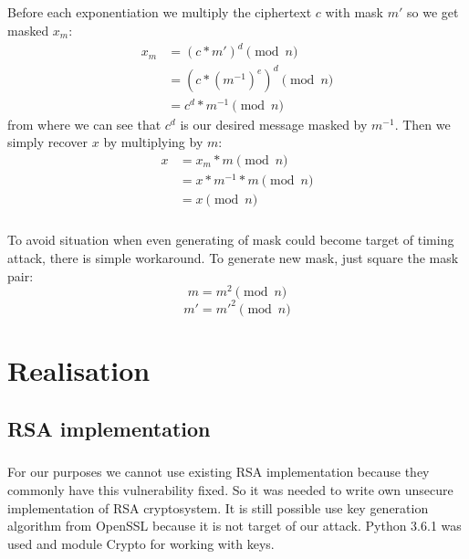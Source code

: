 \documentclass[thesis=B,english]{FITthesis}[2012/10/20]
\begin{document}
{\paragraph*{}
{Before each exponentiation we multiply the ciphertext \(c\) with mask \(m'\) so we get masked \(x_m\):
\begin{equation}
\begin{split}
 x_m & = (c*m')^d \pmod{n} \\
 & = (c * (m^{-1})^e)^d \pmod{n}  \\
 & = c^d * m^{-1} \pmod{n}
\end{split}
\end{equation}
from where we can see that \(c^d\) is our desired message masked by \(m^{-1}\). Then we simply recover \(x\) by multiplying by \(m\)\cite{Kocher1996}:
\begin{equation}
\begin{split}
 x & = x_m * m \pmod{n} \\
 & = x * m^{-1} * m \pmod{n}  \\
 & = x \pmod{n}
\end{split}
\end{equation}
}

\paragraph*{}{
To avoid situation when even generating of mask could become target of timing attack, there is simple workaround. To generate new mask, just square the mask pair:\cite{Kocher1996}
\[m = m^2 \pmod{n}\]
\[m' = m'^2 \pmod{n}\]

}

\chapter{Realisation}

\section{RSA implementation}

\paragraph*{}{
For our purposes we cannot use existing RSA implementation because they commonly have this vulnerability fixed. So it was needed to write own unsecure implementation of RSA cryptosystem.
It is still possible use key generation algorithm from OpenSSL because it is not target of our attack. Python 3.6.1 was used and module Crypto for working with keys.
}
}
\end{document}
